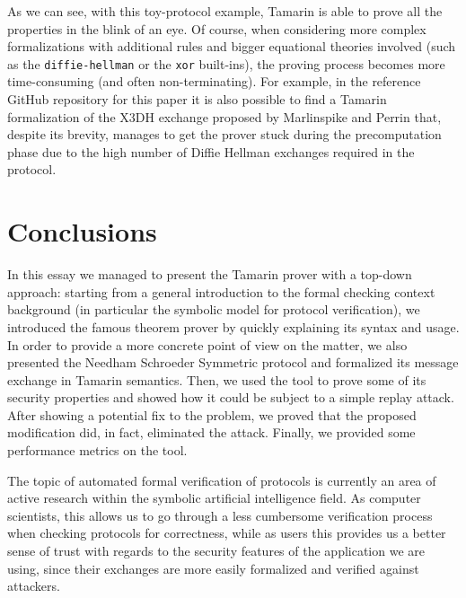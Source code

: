 \documentclass[fleqn,10pt]{SelfArx} %
\begin{document}
As we can see, with this toy-protocol example, Tamarin is able to prove all the properties in the blink of an eye. Of course, when considering more complex formalizations with additional rules and bigger equational theories involved (such as the \lstinline|diffie-hellman| or the \lstinline|xor| built-ins), the proving process becomes more time-consuming (and often non-terminating). For example, in the reference GitHub repository \cite{github} for this paper it is also possible to find a Tamarin formalization of the X3DH exchange proposed by Marlinspike and Perrin \cite{x3dh} that, despite its brevity, manages to get the prover stuck during the precomputation phase due to the high number of Diffie Hellman exchanges required in the protocol.

\section{Conclusions}\label{sec:conclusions}

In this essay we managed to present the Tamarin prover with a top-down approach: starting from a general introduction to the formal checking context background (in particular the symbolic model for protocol verification), we introduced the famous theorem prover by quickly explaining its syntax and usage. In order to provide a more concrete point of view on the matter, we also presented the Needham Schroeder Symmetric protocol and formalized its message exchange in Tamarin semantics. Then, we used the tool to prove some of its security properties and showed how it could be subject to a simple replay attack. After showing a potential fix to the problem, we proved that the proposed modification did, in fact, eliminated the attack. Finally, we provided some performance metrics on the tool.

The topic of automated formal verification of protocols is currently an area of active research within the symbolic artificial intelligence field. As computer scientists, this allows us to go through a less cumbersome verification process when checking protocols for correctness, while as users this provides us a better sense of trust with regards to the security features of the application we are using, since their exchanges are more easily formalized and verified against attackers.

\end{document}
